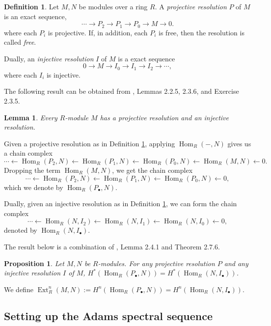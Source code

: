 \documentclass[11pt, titlepage]{article} %
\DeclareMathOperator{\Ext}{Ext}
\DeclareMathOperator{\Hom}{Hom}
\numberwithin{equation}{subsection}
\theoremstyle{plain}
\newtheorem{lemma}[theorem]{Lemma}
\newtheorem{proposition}[theorem]{Proposition}
\theoremstyle{definition}
\newtheorem{definition}[theorem]{Definition}
\begin{document}
\begin{definition}\label{2504211942}
Let \(M, N\) be modules over a ring \(R\). A \textit{projective resolution} \(P\) of \(M\) is an exact sequence,
\[\cdots \to P_2 \to P_1 \to P_0 \to M \to 0.\]
where each \(P_i\) is projective. If, in addition, each \(P_i\) is free, then the resolution is called \textit{free}. 

Dually, an \textit{injective resolution} \(I\) of \(M\) is a exact sequence
\[0 \to M \to I_0 \to I_1 \to I_2 \to \cdots,\]
where each \(I_i\) is injective.
\end{definition}

The following result can be obtained from \autocite{weibel}, Lemmas 2.2.5, 2.3.6, and Exercise 2.3.5. 

\begin{lemma}
Every \(R\)-module \(M\) has a projective resolution and an injective resolution. 
\end{lemma}

Given a projective resolution as in Definition  \ref{2504211942}, applying \(\Hom_R(-, N)\) gives us a chain complex
\[\cdots \leftarrow \Hom_R(P_2, N) \leftarrow \Hom_R(P_1, N) \leftarrow \Hom_R(P_0, N) \leftarrow \Hom_R(M, N) \leftarrow 0.\]
Dropping the term \(\Hom_R(M, N)\), we get the chain complex
\[\cdots \leftarrow \Hom_R(P_2, N) \leftarrow \Hom_R(P_1, N) \leftarrow \Hom_R(P_0, N) \leftarrow 0,\]
which we denote by \(\Hom_R(P_\bullet, N)\). 

Dually, given an injective resolution as in Definition \ref{2504211942}, we can form the chain complex
\[\cdots \leftarrow \Hom_R(N, I_2) \leftarrow \Hom_R(N, I_1) \leftarrow \Hom_R(N, I_0)\leftarrow 0,\]
denoted by \(\Hom_R(N, I_\bullet)\).

The result below is a combination of \autocite{weibel}, Lemma 2.4.1 and Theorem 2.7.6. 

\begin{proposition}
Let \(M, N\) be \(R\)-modules. For any projective resolution \(P\) and any injective resolution \(I\) of \(M\), \(H^*(\Hom_R(P_\bullet, N))=H^*(\Hom_R(N,I_\bullet))\).
\end{proposition}

We define \(\Ext^{n}_R(M,N):=H^n(\Hom_R(P_\bullet, N))=H^n(\Hom_R(N, I_\bullet))\). 

\subsection{Setting up the Adams spectral sequence}\label{2504291248}
\end{document}
